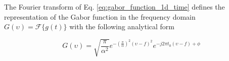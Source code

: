 \documentclass[journal]{IEEEtran}
\begin{document}
The Fourier transform of Eq. \eqref{eq:gabor_function_1d_time} defines the representation of the Gabor function in the frequency domain $G(\upsilon) = \mathcal{F}\{g(t)\}$ with the following analytical form

\begin{equation}\label{eq:gabor_function_1d_freq}
    G(\upsilon) =  \sqrt{\frac{\pi}{\alpha^2}} e ^{-\left(\frac{\pi}{\alpha}\right) ^{2} (\upsilon-f)^2} e ^{-j 2 \pi t_0 (\upsilon-f) + \phi}
\end{equation}


%
%	
\end{document}
